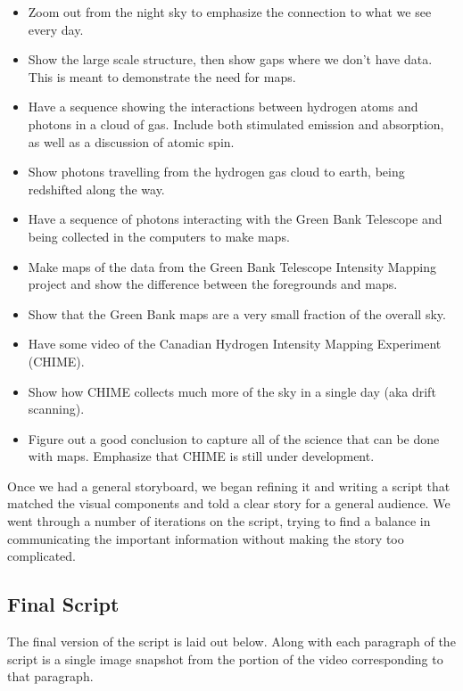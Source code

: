 \begin{itemize}
\item Zoom out from the night sky to emphasize the connection to what we see every day.
\item Show the large scale structure, then show gaps where we don't have data. This is meant to demonstrate the need for \cm maps.
\item Have a sequence showing the interactions between hydrogen atoms and \cm photons in a cloud of gas. Include both stimulated emission and absorption, as well as a discussion of atomic spin.
\item Show photons travelling from the hydrogen gas cloud to earth, being redshifted along the way. 
\item Have a sequence of photons interacting with the Green Bank Telescope and being collected in the computers to make maps.
\item Make maps of the data from the Green Bank Telescope Intensity Mapping project and show the difference between the foregrounds and \cm maps. 
\item Show that the Green Bank maps are a very small fraction of the overall sky.
\item Have some video of the Canadian Hydrogen Intensity Mapping Experiment (CHIME).
\item Show how CHIME collects much more of the sky in a single day (aka drift scanning). 
\item Figure out a good conclusion to capture all of the science that can be done with \cm maps. Emphasize that CHIME is still under development. 
\end{itemize}

Once we had a general storyboard, we began refining it and writing a script that matched the visual components and told a clear story for a general audience. We went through a number of iterations on the script, trying to find a balance in communicating the important information without making the story too complicated. 


\subsection{Final Script}

The final version of the script is laid out below. Along with each paragraph of the script is a single image snapshot from the portion of the video corresponding to that paragraph. 

